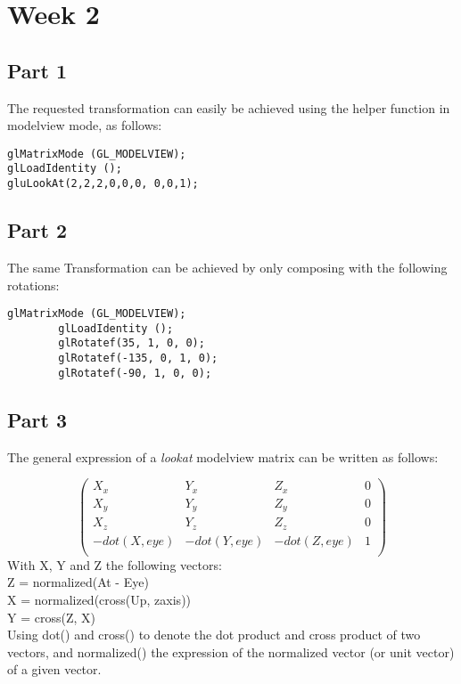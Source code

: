 \chapter{Week 2}

\section{Part 1}

The requested transformation can easily be achieved using the helper function
 in modelview mode, as follows:

\begin{lstlisting}
glMatrixMode (GL_MODELVIEW);
glLoadIdentity ();
gluLookAt(2,2,2,0,0,0, 0,0,1);
\end{lstlisting}


\section{Part 2}
The same Transformation can be achieved by only composing with the following rotations:
\begin{lstlisting}[caption=Extract from Part2.cpp]
        glMatrixMode (GL_MODELVIEW);
        glLoadIdentity ();
        glRotatef(35, 1, 0, 0);
        glRotatef(-135, 0, 1, 0);
        glRotatef(-90, 1, 0, 0);
\end{lstlisting}

\section{Part 3}


The general expression of a \textit{lookat} modelview matrix can be written as follows:

$$\begin{pmatrix}
 	X_x&		Y_x&           	Z_x&          	0\\
	 X_y&       Y_y&           	Z_y&          	0\\
	 X_z&       Y_z&           	Z_z&          	0\\
	-dot(X, eye)&  -dot(Y, eye)&  	-dot(Z, eye)&  	1\\
\end{pmatrix}$$
With X, Y and Z the following vectors:\\
Z = normalized(At - Eye)\\
X = normalized(cross(Up, zaxis))\\
Y = cross(Z, X)\\
Using dot() and cross() to denote the dot product and cross product of two vectors,
and normalized() the expression of the normalized vector (or unit vector) of a given vector.

